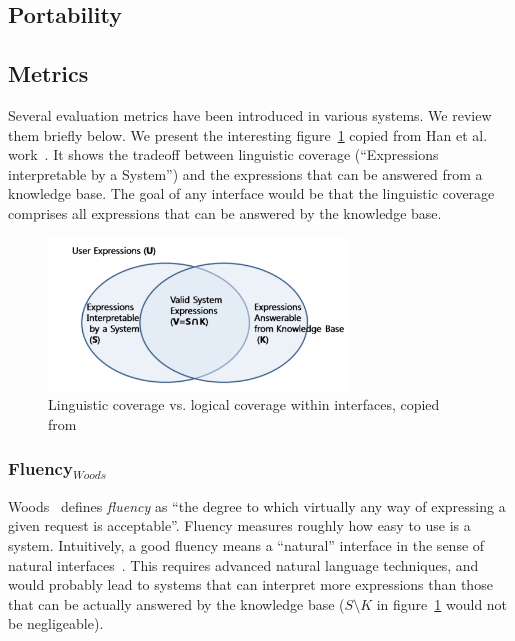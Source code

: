 \documentclass[10pt,journal,letterpaper,compsoc]{IEEEtran}
\begin{document}
\subsection{Portability}


\subsection{Metrics}
\label{sec:big-picture-metrics}
Several evaluation metrics have been introduced in various systems. We review
them briefly below.
We present the interesting figure~\ref{fig:interface} copied from Han et al.
work~\cite{Han:2010:NLI:1719970.1720022}. It shows the tradeoff between
linguistic coverage (``Expressions interpretable by a System'') and the
expressions that can be answered from a knowledge base. The goal of any
interface would be that the linguistic coverage comprises all expressions that
can be answered by the knowledge base.

 \begin{figure}[!h]
\centering
\includegraphics[width=8cm]{images/interface}
\caption{Linguistic coverage vs. logical coverage within interfaces, copied
from~\cite{Han:2010:NLI:1719970.1720022}}
\label{fig:interface}
\end{figure}

\subsubsection{Fluency$_{Woods}$}
Woods~\cite{Woods:1973:PNL:1499586.1499695} defines {\it fluency} as ``the degree
to which virtually any way of expressing a given request is acceptable''.
Fluency measures roughly how easy to use is a system. 
Intuitively, a good fluency means a ``natural'' interface in the sense of
natural interfaces~\cite{Hearst:2011:NSU:2018396.2018414}. This requires
advanced natural language techniques, and would probably lead to systems that
can interpret more expressions than those that can be actually answered by the
knowledge base ($S\setminus K$ in figure~\ref{fig:interface} would not be
negligeable).
 
\end{document}
